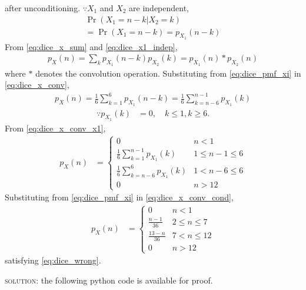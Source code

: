 \documentclass{article}
\numberwithin{equation}{subsection}
\numberwithin{figure}{subsection}
\providecommand{\pr}[1]{\ensuremath{\Pr\left(#1\right)}}
\renewcommand\thesection{\arabic{section}}
\renewcommand\thesubsection{\thesection.\arabic{subsection}}
\begin{document}
\begin{enumerate}[label=\thesubsection.\arabic*.,ref=\thesubsection.\arabic{figure}]
after unconditioning.  $\because X_1$ and $X_2$ are independent,
\begin{multline}
\pr{X_1  = n -k | X_2 = k} 
\\
= \pr{X_1  = n -k} = p_{X_1}(n-k)
\label{eq:dice_x1_indep}
\end{multline}
From \eqref{eq:dice_x_sum} and \eqref{eq:dice_x1_indep},
\begin{align}
p_X(n) = \sum_{k}^{}p_{X_1}(n-k)p_{X_2}(k) = p_{X_1}(n)*p_{X_2}(n)
\label{eq:dice_x_conv}
\end{align}
where $*$ denotes the convolution operation. 
Substituting from \eqref{eq:dice_pmf_xi}
in \eqref{eq:dice_x_conv},
\begin{align}
p_X(n) = \frac{1}{6}\sum_{k=1}^{6}p_{X_1}(n-k)= \frac{1}{6}\sum_{k=n-6}^{n-1}p_{X_1}(k)
\label{eq:dice_x_conv_x1}
\end{align}
\begin{align}
\because p_{X_1}(k) &= 0, \quad k \le 1, k \ge 6.
\end{align}
From \eqref{eq:dice_x_conv_x1},
%
\begin{align}
p_X(n) &= 
\begin{cases}
0 & n < 1
\\
\frac{1}{6}\sum_{k=1}^{n-1}p_{X_1}(k) &  1 \le n-1 \le  6
\\
\frac{1}{6}\sum_{k=n-6}^{6}p_{X_1}(k) & 1 < n-6 \le 6
\\
0 & n > 12
\end{cases}
\label{eq:dice_x_conv_cond}
\end{align}
Substituting from \eqref{eq:dice_pmf_xi} in \eqref{eq:dice_x_conv_cond},
\begin{align}
p_X(n) &= 
\begin{cases}
0 & n < 1
\\
\frac{n-1}{36} &  2 \le n \le  7
\\
\frac{13-n}{36} & 7 < n \le 12
\\
0 & n > 12
\end{cases}
\label{eq:dice_x_conv_final}
\end{align}
satisfying \eqref{eq:dice_wrong}.
\begin{flushleft}
 \textsc{solution:} the following python code is available for proof.
 \end{flushleft}
 \begin{center}

\end{center}
\end{enumerate}
\end{document}
